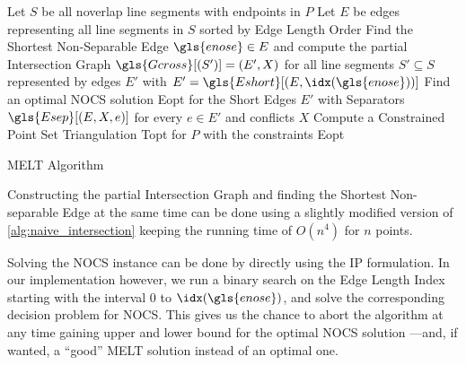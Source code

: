 \begin{algorithm}
  \DontPrintSemicolon
  
  Let \(S\) be all \gls{noverlap} line segments with endpoints in \(P\) \;
  Let \(E\) be edges representing all line segments in \(S\) sorted
    by Edge Length Order \;
  Find the Shortest Non-Separable Edge \(\gls{enose} \in E\)
    and compute the partial Intersection Graph \(\gls{Gcross}[(S')] = (E',X)\)
    for all line segments \(S' \subseteq S\)
    represented by edges \(E'\)
    with \(E' = \gls{Eshort}[(E,\idx(\gls{enose}))]\) \;
  Find an optimal \gls{NOCS} solution \gls{Eopt}
    for the Short Edges \(E'\)
    with Separators \(\gls{Esep}[(E,X,e)]\) for every \(e \in E'\)
    and conflicts \(X\) \;
  Compute a Constrained Point Set Triangulation \gls{Topt}
    for \(P\) with the constraints \gls{Eopt} \;
  
  \caption{\label{alg:melt}\gls{MELT} Algorithm}
\end{algorithm}

Constructing the partial Intersection Graph and finding the Shortest
Non-separable Edge at the same time can be done using a slightly
modified version of \cref{alg:naive_intersection} keeping the running
time of \(O(n^4)\) for \(n\) points.

Solving the \gls{NOCS} instance can be done by directly using the
\gls{IP} formulation. In our implementation however, we run a binary
search on the Edge Length Index starting with the interval 0 to
\(\idx(\gls{enose})\), and solve the corresponding decision problem
for \gls{NOCS}. This gives us the chance to abort the algorithm at any
time gaining upper and lower bound for the optimal \gls{NOCS} solution%
---and, if wanted, a ``good'' \gls{MELT} solution instead of an
optimal one.

